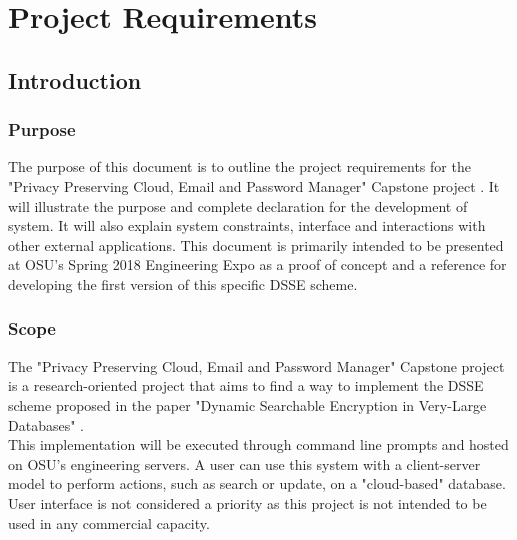 \chapter{Project Requirements}


\section{Introduction}
\subsection{ Purpose }

The purpose of this document is to outline the project requirements for the "Privacy Preserving Cloud, Email and Password Manager" Capstone project \cite{capstone}. It will illustrate the purpose and complete declaration for the development of system. It will also explain system constraints, interface and interactions with other external applications. This document is primarily intended to be presented at OSU's Spring 2018 Engineering Expo as a proof of concept and a reference for developing the first version of this specific DSSE scheme.
\subsection{ Scope }
The "Privacy Preserving Cloud, Email and Password Manager" Capstone project is a research-oriented project that aims to find a way to implement the DSSE scheme proposed in the paper "Dynamic Searchable Encryption in Very-Large Databases" \cite{cash14}.\\
This implementation will be executed through command line prompts and hosted on OSU's engineering servers. A user can use this system with a client-server model to perform actions, such as search or update, on a "cloud-based" database. User interface is not considered a priority as this project is not intended to be used in any commercial capacity.

